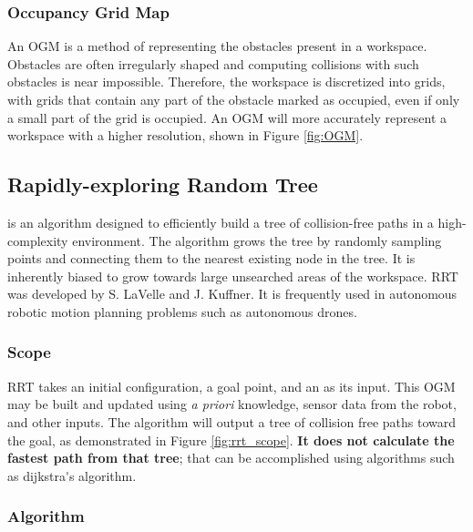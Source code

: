     

    \subsubsection{Occupancy Grid Map}
    An \gls{OGM} is a method of representing the obstacles present in a \gls{workspace}. Obstacles are often irregularly shaped and computing collisions with such obstacles is near impossible. Therefore, the \gls{workspace} is discretized into grids, with grids that contain any part of the obstacle marked as occupied, even if only a small part of the grid is occupied. An \gls{OGM} will more accurately represent a \gls{workspace} with a higher resolution, shown in Figure \ref{fig:OGM}.

    

\subsection{Rapidly-exploring Random Tree}
    
     is an algorithm designed to efficiently build a tree of collision-free paths in a high-complexity environment. The algorithm grows the tree by randomly sampling points and connecting them to the nearest existing node in the tree. It is inherently biased to grow towards large unsearched areas of the workspace. RRT was developed by S. LaVelle\cite{LaValle1998} and J. Kuffner\cite{LaValle2001}. It is frequently used in autonomous robotic motion planning problems such as autonomous drones.

    \subsubsection{Scope}
        \gls{RRT} takes an initial configuration, a goal point, and an  as its input. This \gls{OGM} may be built and updated using \textit{\gls{a priori}} knowledge, sensor data from the robot, and other inputs. The algorithm will output a tree of collision free paths toward the goal, as demonstrated in Figure \ref{fig:rrt_scope}. \textbf{It does not calculate the fastest path from that tree}; that can be accomplished using algorithms such as \Gls{dijkstra's algorithm}.

        

    \subsubsection{Algorithm}

